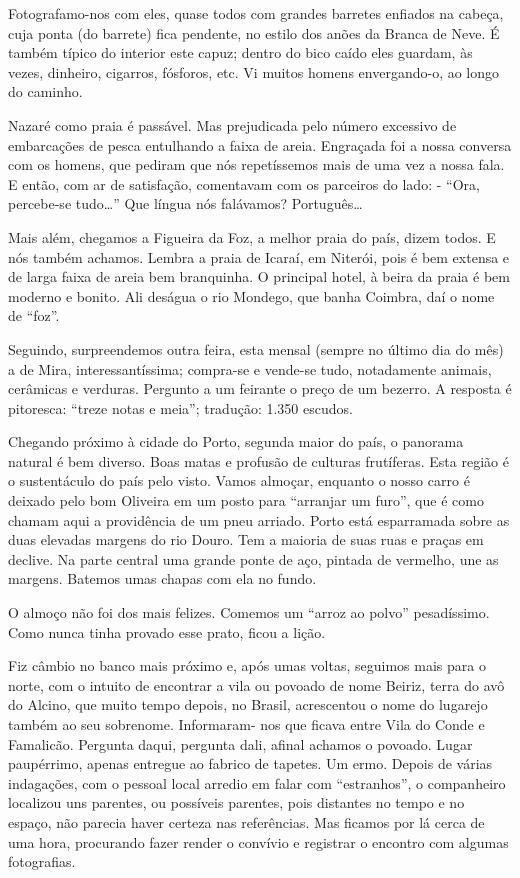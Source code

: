 Fotografamo-nos com eles, quase todos com grandes barretes enfiados na cabeça, cuja ponta (do barrete) fica pendente, no estilo dos anões da Branca de Neve. É também típico do interior este capuz; dentro do bico caído eles guardam, às vezes, dinheiro, cigarros, fósforos, etc. Vi muitos homens envergando-o, ao longo do caminho.

Nazaré como praia é passável. Mas prejudicada pelo número excessivo de embarcações de pesca entulhando a faixa de areia. Engraçada foi a nossa conversa com os homens, que pediram que nós repetíssemos mais de uma vez a nossa fala. E então, com ar de satisfação, comentavam com os parceiros do lado: - “Ora, percebe-se tudo\ldots” Que língua nós falávamos? Português\ldots

Mais além, chegamos a Figueira da Foz, a melhor praia do país, dizem todos. E nós também achamos. Lembra a praia de Icaraí, em Niterói, pois é bem extensa e de larga faixa de areia bem branquinha. O principal hotel, à beira da praia é bem moderno e bonito. Ali deságua o rio Mondego, que banha Coimbra, daí o nome de “foz”.

Seguindo, surpreendemos outra feira, esta mensal (sempre no último dia do mês) a de Mira, interessantíssima; compra-se e vende-se tudo, notadamente animais, cerâmicas e verduras. Pergunto a um feirante o preço de um bezerro. A resposta é pitoresca: “treze notas e meia”; tradução: 1.350 escudos.

Chegando próximo à cidade do Porto, segunda maior do país, o panorama natural é bem diverso. Boas matas e profusão de culturas frutíferas. Esta região é o sustentáculo do país pelo visto. Vamos almoçar, enquanto o nosso carro é deixado pelo bom Oliveira em um posto para “arranjar um furo”, que é como chamam aqui a providência de um pneu arriado. Porto está esparramada sobre as duas elevadas margens do rio Douro. Tem a maioria de suas ruas e praças em declive. Na parte central uma grande ponte de aço, pintada de vermelho, une as margens. Batemos umas chapas com ela no fundo.

O almoço não foi dos mais felizes. Comemos um “arroz ao polvo” pesadíssimo. Como nunca tinha provado esse prato, ficou a lição.

Fiz câmbio no banco mais próximo e, após umas voltas, seguimos mais para o norte, com o intuito de encontrar a vila ou povoado de nome Beiriz, terra do avô do Alcino, que muito tempo depois, no Brasil, acrescentou o nome do lugarejo também ao seu sobrenome. Informaram- nos que ficava entre Vila do Conde e Famalicão. Pergunta daqui, pergunta dali, afinal achamos o povoado. Lugar paupérrimo, apenas entregue ao fabrico de tapetes. Um ermo. Depois de várias indagações, com o pessoal local arredio em falar com “estranhos”, o companheiro localizou uns parentes, ou possíveis parentes, pois distantes no tempo e no espaço, não parecia haver certeza nas referências. Mas ficamos por lá cerca de uma hora, procurando fazer render o convívio e registrar o encontro com algumas fotografias.

